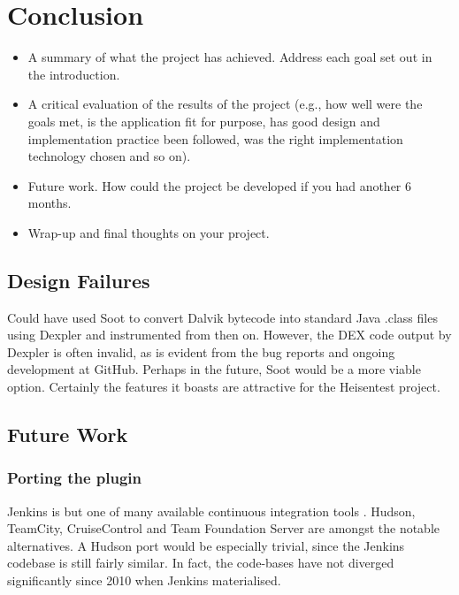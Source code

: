 \section{Conclusion}
\label{sec:conc}

\begin{framed}
	\begin{itemize}
		\item A summary of what the project has achieved. Address each goal set out in the introduction.
		\item A critical evaluation of the results of the project (e.g., how well were the goals met, is the application fit for purpose, has good design and implementation practice been followed, was the right implementation technology chosen and so on).
		\item Future work. How could the project be developed if you had another 6 months.
		\item Wrap-up and final thoughts on your project.
	\end{itemize}
\end{framed}


\subsection{Design Failures}

Could have used Soot to convert Dalvik bytecode into standard Java .class files using Dexpler \cite{bartel:soap2012} and instrumented from then on. However, the DEX code output by Dexpler is often invalid, as is evident from the bug reports and ongoing development at GitHub. Perhaps in the future, Soot would be a more viable option. Certainly the features it boasts are attractive for the Heisentest project.


\subsection{Future Work}

\subsubsection{Porting the plugin}

Jenkins is but one of many available continuous integration tools \cite{ContinuousIntegrationSoftware}. Hudson, TeamCity, CruiseControl and Team Foundation Server are amongst the notable alternatives. A Hudson port would be especially trivial, since the Jenkins codebase is still fairly similar. In fact, the code-bases have not diverged significantly since 2010 when Jenkins materialised.

